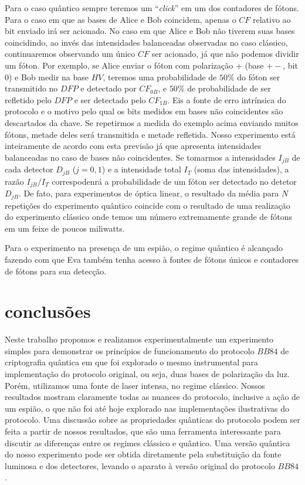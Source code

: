 \documentclass[pra, twocolumn]{revtex4}
\begin{document}
Para o caso qu\^antico sempre teremos um ``\textit{click}'' em um dos contadores de f\'otons. Para o caso em que as bases de Alice e Bob coincidem, apenas o $CF$ relativo ao bit enviado ir\'a ser acionado. No caso em que Alice e Bob n\~ao tiverem suas bases coincidindo, ao inv\'es das intensidades balanceadas observadas no caso cl\'assico, continuaremos  observando um \'unico $CF$ ser acionado, j\'a que n\~ao podemos dividir um f\'oton. Por exemplo, se Alice enviar o f\'oton com polariza\c c\~ao $+$ (base $+-$, bit $0$) e Bob medir na base $HV$, teremos uma probabilidade de $50\%$ do f\'oton ser transmitido no $DFP$ e detectado por $CF_{0B}$, e  $50\%$ de probabilidade de ser refletido pelo $DFP$ e ser detectado pelo $CF_{1B}$. Eis a fonte de erro intr\'insica do protocolo e o motivo pelo qual os bits medidos em bases n\~ao coincidentes s\~ao descartados da chave. Se repetirmos a medida do exemplo acima enviando muitos f\'otons, metade deles
ser\'a transmitida e metade refletida. Nosso experimento est\'a inteiramente de acordo com esta previs\~ao j\'a que apresenta intensidades balanceadas no caso de bases n\~ao coincidentes. Se tomarmos a intensidades $I_{jB}$ de cada detector $ D_{jB}$ ($j=0,1$) e a intensidade total $I_T$ (soma das intensidades), a raz\~ao $I_{jB}/I_T$ correspodenr\'a a probabilidade de um f\'oton ser detectado no detetor $D_{jB}$. De fato, para experimentos de \'optica linear, o resultado da m\'edia para $N$ repeti\c c\~oes do experimento qu\^antico coincide com o resultado de uma realiza\c c\~ao do experimento cl\'assico onde temos um n\'umero extremamente grande de f\'otons em um feixe de poucos miliwatts.  

Para o experimento na presen\c ca de um espi\~ao, o regime qu\^antico \'e alcan\c cado fazendo com que Eva tamb\'em tenha acesso \`a fontes de f\'otons \'unicos e contadores de f\'otons para sua detec\c c\~ao. 

\section{conclus\~oes}

 Neste trabalho propomos e realizamos experimentalmente um experimento simples para demonstrar os princ\'ipios de funcionamento do protocolo $BB84$ de criptografia qu\^antica em que foi explorado o mesmo instrumental para implementa\c c\~ao do protocolo original, ou seja, duas bases de polariza\c c\~ao da luz. Por\'em, utilizamos uma fonte de laser intensa, no regime cl\'assico. Nossos resultados mostram claramente todas as nuances do protocolo, inclusive a a\c c\~ao de um espi\~ao, o que n\~ao foi at\'e hoje explorado nas implementa\c c\~oes ilustrativas do protocolo. Uma discuss\~ao sobre as propriedades qu\^anticas do protocolo podem ser feita a partir de nossos resultados, que s\~ao uma ferramenta interessante para discutir as diferen\c cas entre os regimes cl\'assico e qu\^antico. Uma vers\~ao qu\^antica do nosso experimento pode ser obtida diretamente pela substitui\c c\~ao da fonte luminosa e dos detectores, levando o aparato \`a vers\~ao original do protocolo $BB84$.
\end{document}
